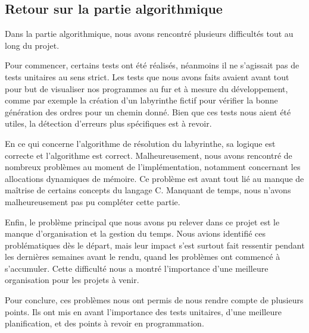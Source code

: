 \subsection{Retour sur la partie algorithmique}

Dans la partie algorithmique, nous avons rencontré plusieurs difficultés tout au long du projet.

Pour commencer, certains tests ont été réalisés, néanmoins il ne s’agissait pas de tests unitaires au sens strict. Les tests que nous avons faits avaient avant tout pour but de visualiser nos programmes au fur et à mesure du développement, comme par exemple la création d’un labyrinthe fictif pour vérifier la bonne génération des ordres pour un chemin donné. Bien que ces tests nous aient été utiles, la détection d’erreurs plus spécifiques est à revoir.

En ce qui concerne l’algorithme de résolution du labyrinthe, sa logique est correcte et l’algorithme est correct. Malheureusement, nous avons rencontré de nombreux problèmes au moment de l’implémentation, notamment concernant les allocations dynamiques de mémoire. Ce problème est avant tout lié au manque de maîtrise de certains concepts du langage C. Manquant de temps, nous n’avons malheureusement pas pu compléter cette partie.

Enfin, le problème principal que nous avons pu relever dans ce projet est le manque d’organisation et la gestion du temps. Nous avions identifié ces problématiques dès le départ, mais leur impact s’est surtout fait ressentir pendant les dernières semaines avant le rendu, quand les problèmes ont commencé à s’accumuler. Cette difficulté nous a montré l’importance d’une meilleure organisation pour les projets à venir.

Pour conclure, ces problèmes nous ont permis de nous rendre compte de plusieurs points. Ils ont mis en avant l’importance des tests unitaires, d’une meilleure planification, et des points à revoir en programmation.
